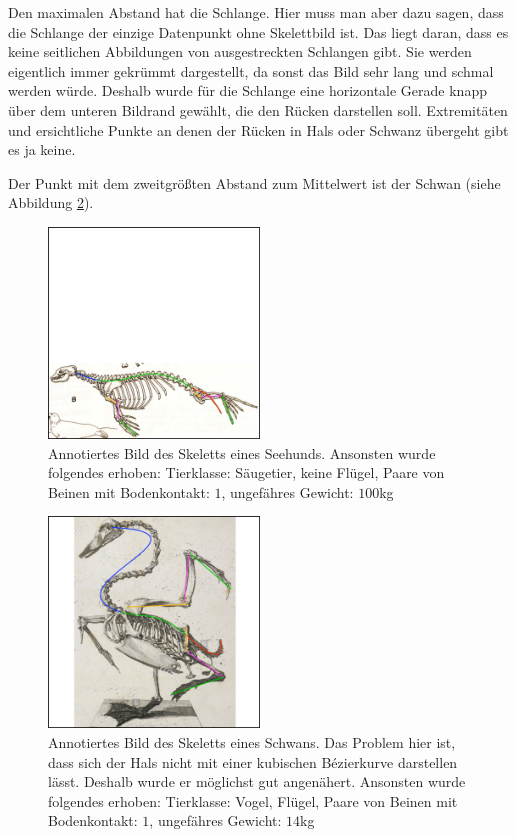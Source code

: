  Den maximalen Abstand hat die Schlange. Hier muss man aber dazu sagen, dass die Schlange der einzige Datenpunkt ohne Skelettbild ist. Das liegt daran, dass es keine seitlichen Abbildungen von ausgestreckten Schlangen gibt. Sie werden eigentlich immer gekrümmt dargestellt, da sonst das Bild sehr lang und schmal werden würde. Deshalb wurde für die Schlange eine horizontale Gerade knapp über dem unteren Bildrand gewählt, die den Rücken darstellen soll. Extremitäten und ersichtliche Punkte an denen der Rücken in Hals oder Schwanz übergeht gibt es ja keine.
 
 Der Punkt mit dem zweitgrößten Abstand zum Mittelwert ist der Schwan (siehe Abbildung \ref{schwan_farbig}).
 
 \begin{figure}
  \centering
  \includegraphics[width = 0.5\textwidth]{../PCA/Skelettbilder/Seehund_farbig.png}
  \caption{Annotiertes Bild des Skeletts eines Seehunds. Ansonsten wurde folgendes erhoben:
  Tierklasse: Säugetier, keine Flügel, Paare von Beinen mit Bodenkontakt: $1$, ungefähres Gewicht: $100$kg}
  \label{seehund_farbig}
 \end{figure}
 
  \begin{figure}
  \centering
  \includegraphics[width = 0.5\textwidth]{../PCA/Skelettbilder/Schwan_farbig.png}
  \caption{Annotiertes Bild des Skeletts eines Schwans. Das Problem hier ist, dass sich der Hals nicht mit einer kubischen Bézierkurve darstellen lässt. Deshalb wurde er möglichst gut angenähert. Ansonsten wurde folgendes erhoben:
  Tierklasse: Vogel, Flügel, Paare von Beinen mit Bodenkontakt: $1$, ungefähres Gewicht: $14$kg}
  \label{schwan_farbig}
 \end{figure}
 
